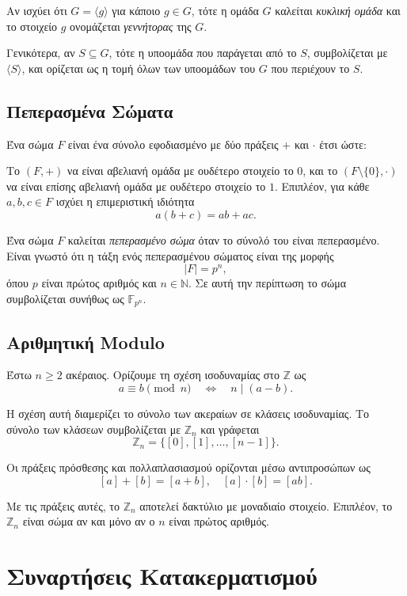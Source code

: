 \documentclass[12pt,a4paper]{report}
\begin{document}
Αν ισχύει ότι $G = \langle g \rangle$ για κάποιο $g \in G$, τότε η ομάδα $G$ καλείται \textit{κυκλική ομάδα} και το στοιχείο $g$ ονομάζεται \textit{γεννήτορας} της $G$.

Γενικότερα, αν $S \subseteq G$, τότε η υποομάδα που παράγεται από το $S$, συμβολίζεται με $\langle S \rangle$, και ορίζεται ως η τομή όλων των υποομάδων του $G$ που περιέχουν το $S$.

\subsection{Πεπερασμένα Σώματα}

Ένα σώμα $F$ είναι ένα σύνολο εφοδιασμένο με δύο πράξεις $+$ και $\cdot$ έτσι ώστε:

Το $(F,+)$ να είναι αβελιανή ομάδα με ουδέτερο στοιχείο το $0$, και το $(F \setminus \{0\}, \cdot)$ να είναι επίσης αβελιανή ομάδα με ουδέτερο στοιχείο το $1$. Επιπλέον, για κάθε $a,b,c \in F$ ισχύει η επιμεριστική ιδιότητα
\[
a(b+c) = ab + ac.
\]

Ένα σώμα $F$ καλείται \textit{πεπερασμένο σώμα} όταν το σύνολό του είναι πεπερασμένο. Είναι γνωστό ότι η τάξη ενός πεπερασμένου σώματος είναι της μορφής
\[
|F| = p^n,
\]
όπου $p$ είναι πρώτος αριθμός και $n \in \mathbb{N}$. Σε αυτή την περίπτωση το σώμα συμβολίζεται συνήθως ως $\mathbb{F}_{p^n}$.

\subsection{Αριθμητική Modulo}

Έστω $n \ge 2$ ακέραιος. Ορίζουμε τη σχέση ισοδυναμίας στο $\mathbb{Z}$ ως
\[
a \equiv b \pmod{n} \quad \Longleftrightarrow \quad n \mid (a-b).
\]

Η σχέση αυτή διαμερίζει το σύνολο των ακεραίων σε κλάσεις ισοδυναμίας. Το σύνολο των κλάσεων συμβολίζεται με $\mathbb{Z}_n$ και γράφεται
\[
\mathbb{Z}_n = \{ [0], [1], \dots, [n-1] \}.
\]

Οι πράξεις πρόσθεσης και πολλαπλασιασμού ορίζονται μέσω αντιπροσώπων ως
\[
[a] + [b] = [a+b], \quad [a]\cdot[b] = [ab].
\]

Με τις πράξεις αυτές, το $\mathbb{Z}_n$ αποτελεί δακτύλιο με μοναδιαίο στοιχείο. Επιπλέον, το $\mathbb{Z}_n$ είναι σώμα αν και μόνο αν ο $n$ είναι πρώτος αριθμός.
\section{Συναρτήσεις Κατακερματισμού}
\end{document}
